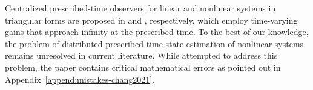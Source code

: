 \documentclass[journal]{IEEEtran}
\begin{document}

Centralized prescribed-time observers for linear and nonlinear systems in triangular forms are proposed in \cite{Holloway19} and \cite{Adil2024}, respectively, which employ time-varying gains that approach infinity at the prescribed time. To the best of our knowledge, the problem of distributed prescribed-time state estimation of nonlinear systems remains unresolved in current literature. While \cite{Chang2021} attempted to address this problem, the paper contains critical mathematical errors as pointed out in Appendix~\ref{append:mistakes-chang2021}.



\end{document}
